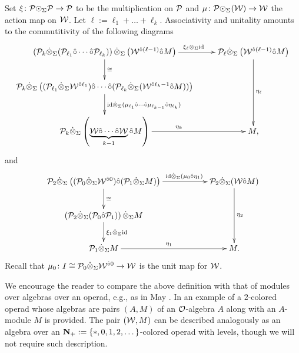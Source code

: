     Set $\xi\colon \mathcal{P}{\odot}_{\Sigma} \mathcal{P}\to \mathcal{P}$ to be the multiplication on $\mathcal{P}$ and $\mu\colon \mathcal{P}{\odot}_{\Sigma} (\mathcal{W})\to \mathcal{W}$ the action map on $\mathcal{W}$. Let $\ell:=\ell_1+\dots+\ell_k$. Associativity and unitality amounts to the commutitivity of the following diagrams \begin{equation} \label{assoc-A-infty-alg}
        \xymatrix{
            \left(\Cal{P}_{k}\tensordot_{\Sigma}  (\Cal{P}_{\ell_1}\circhat \cdots \circhat \Cal{P}_{\ell_k})\right) \tensordot_{\Sigma}  \left( \Cal{W}^{\circhat (\ell-1)} \circhat M\right) \ar[r]^<(.2){\xi_{\ell}\otimes_{\Sigma}\id} \ar[d]^{\cong}
            &
            \Cal{P}_{\ell} \tensordot_{\Sigma}  \left( \Cal{W}^{\circhat (\ell-1)} \circhat M\right) \ar[dd]^{\eta_{\ell}}
            \\
            \Cal{P}_{k}\tensordot_{\Sigma}  \left( (\Cal{P}_{\ell_1}\tensordot_{\Sigma}  \Cal{W}^{\circhat \ell_1} ) \circhat \cdots\circhat (\Cal{P}_{\ell_k} \tensordot_{\Sigma}  ( \Cal{W}^{\circhat \ell_k-1}\circhat M ) ) \right) 
            \ar[d]^<(.3){\id\tensordot_{\Sigma} (\mu_{\ell_1} \circhat \cdots \circhat \mu_{\ell_{k-1}}\circhat \eta_{\ell_k})}
            &
            \\
            \Cal{P}_k \tensordot_{\Sigma}  \left( \underbrace{\Cal{W}\circhat \cdots \circhat \Cal{W}}_{k-1} \circhat M \right) \ar[r]^{\eta_k}
            &
        M,
        }
    \end{equation} and
    \begin{equation} \label{unit-A-infty-alg}
        \xymatrix{
            \Cal{P}_2 \tensordot_{\Sigma}  \left( (\Cal{P}_0\tensordot_{\Sigma}  \Cal{W}^{\circhat 0}) \circhat (\Cal{P}_1\tensordot_{\Sigma}  M) \right) \ar[rr]^<(.3){\id\tensordot_{\Sigma} (\mu_0 \circhat \eta_1)} \ar[d]^{\cong}
            &&
            \Cal{P}_2\tensordot_{\Sigma}  (\Cal{W} \circhat M) \ar[dd]^{\eta_2}
            \\
            \left( \Cal{P}_2 \tensordot_{\Sigma}  (\Cal{P}_0\circhat \Cal{P}_1) \right) \tensordot_{\Sigma}  M \ar[d]^{\xi_1\tensordot_{\Sigma} \id}
            &&
            \\
            \Cal{P}_1 \tensordot_{\Sigma}  M \ar[rr]^{\eta_1}
            &&
            M.}
    \end{equation} Recall that $\mu_0\colon I\cong \mathcal{P}_0\dot{\otimes}_{\Sigma}  \mathcal{W}^{\hat{\circ} 0}\to \mathcal{W}$ is the unit map for $\mathcal{W}$.

\begin{remark}
    We encourage the reader to compare the above definition with that of modules over algebras over an operad, e.g.,  as in May \cite[Definition 3]{May}. In \cite[1.5.1]{BM-trees} an example of a $2$-colored operad whose algebras are pairs $(A,M)$ of an $\mathcal{O}$-algebra $A$ along with an $A$-module $M$ is provided. The pair $(\mathcal{W}, M)$ can be described analogously as an algebra over an $\mathbf{N}_+:=\{*, 0,1,2,\dots\}$-colored operad with levels, though we will not require such description.  
\end{remark}

